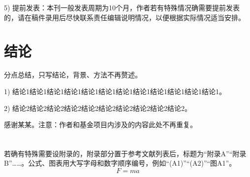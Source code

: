 \documentclass{aaas}
\begin{document}
5) 提前发表：本刊一般发表周期为10个月，作者若有特殊情况确需要提前发表的，请在稿件录用后尽快联系责任编辑说明情况，以便根据实际情况适当安排。

\section{结\hspace{1em}论}
分点总结，只写结论，背景、方法不再赘述。

1) 结论1结论1结论1结论1结论1结论1结论1结论1结论1结论1结论1结论1。

2) 结论2结论2结论2结论2结论2结论2结论2结论2结论2结论2。

\acknowledgments
感谢某某。注意：作者和基金项目内涉及的内容此处不再重复。




\Editor{\hspace{2em}}

\appendix
\section{}
若确有特殊需要设附录的，附录部分置于参考文献列表后，标题为“附录A”“附录B”……。公式、图表用大写字母和数字顺序编号，例如“(A1)”“(A2)”“图A1”。
\begin{equation}
F = ma
\end{equation}

\makeEtitle
\end{document}

